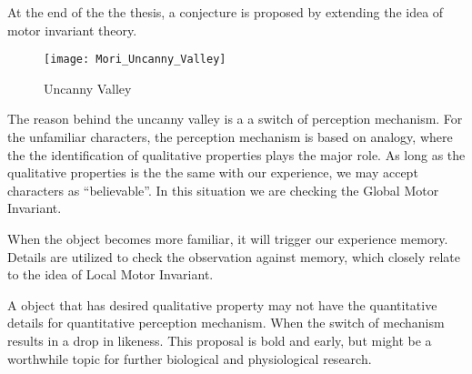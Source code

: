 At the end of the the thesis, a conjecture is proposed by extending the idea of motor invariant theory.


\begin{figure}[!htbp]
  \begin{center}
      \texttt{[image: Mori\_Uncanny\_Valley]}
    \caption{Uncanny Valley}
    \label{fig:uncannyValley}
\end{center}
\end{figure}

The reason behind the uncanny valley is a  a switch of perception mechanism.
For the unfamiliar characters, the perception mechanism is based on analogy,
where the the identification of qualitative properties plays the major role.
As long as the qualitative properties is the the same with our experience, we may accept characters as ``believable''.
In this situation we are checking the Global Motor Invariant.

When the object becomes more familiar, it will trigger our experience memory.
Details are utilized to check the observation against memory,
which closely relate to the idea of Local Motor Invariant.


A object that has desired qualitative property may not have the quantitative details for quantitative perception mechanism.
When the switch of mechanism results in a drop in likeness.
This proposal is bold and early, but might be a worthwhile topic for further biological and physiological research.







